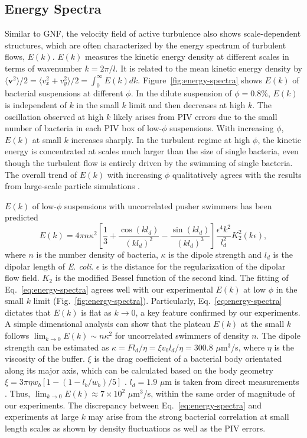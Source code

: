 \subsection{Energy Spectra}
Similar to GNF, the velocity field of active turbulence also shows scale-dependent structures, which are often characterized by the energy spectrum of turbulent flows, $E(k)$. $E(k)$ measures the kinetic energy density at different scales in terms of wavenumber $k = 2\pi/l$. It is related to the mean kinetic energy density by $\langle \bm{v}^2 \rangle/2 = \langle v_x^2 + v_y^2 \rangle/2 = \int_0^\infty E(k)dk$. Figure~\ref{fig:energy-spectra} shows $E(k)$ of bacterial suspensions at different $\phi$. In the dilute suspension of $\phi = 0.8 \%$, $E(k)$ is independent of $k$ in the small $k$ limit and then decreases at high $k$. The oscillation observed at high $k$ likely arises from PIV errors due to the small number of bacteria in each PIV box of low-$\phi$ suspensions. With increasing $\phi$, $E(k)$ at small $k$ increases sharply. In the turbulent regime at high $\phi$, the kinetic energy is concentrated at scales much larger than the size of single bacteria, even though the turbulent flow is entirely driven by the swimming of single bacteria. The overall trend of $E(k)$ with increasing $\phi$ qualitatively agrees with the results from large-scale particle simulations \cite{Saintillan2012,Bardfalvy2019}.

$E(k)$ of low-$\phi$ suspensions with uncorrelated pusher swimmers has been predicted \cite{Bardfalvy2019}
\begin{equation}
\label{eq:energy-spectra}
E(k) = 4\pi n \kappa^2 \left[ \frac{1}{3} + \frac{\cos(kl_d)}{(kl_d)^2} - \frac{\sin(kl_d)}{(kl_d)^3} \right] \frac{\epsilon^4k^2}{l_d^2} K_2^2(k\epsilon),
\end{equation}
where $n$ is the number density of bacteria, $\kappa$ is the dipole strength and $l_d$ is the dipolar length of \textit{E. coli}. $\epsilon$ is the distance for the regularization of the dipolar flow field. $K_2$ is the modified Bessel function of the second kind.
The fitting of Eq.~\ref{eq:energy-spectra} agrees well with our experimental $E(k)$ at low $\phi$ in the small $k$ limit (Fig.~\ref{fig:energy-spectra}). Particularly, Eq.~\ref{eq:energy-spectra} dictates that $E(k)$ is flat as $k \to 0$, a key feature confirmed by our experiments. A simple dimensional analysis can show that the plateau $E(k)$ at the small $k$ follows $\lim_{k \to 0}E(k) \sim n \kappa^2$ for uncorrelated swimmers of density $n$. The dipole strength can be estimated as $\kappa = Fl_d/\eta = \xi v_0 l_d/\eta = 300.8$ $\mu$m$^3$/s, where $\eta$ is the viscosity of the buffer. $\xi$ is the drag coefficient of a bacterial body orientated along its major axis, which can be calculated based on the body geometry $\xi = 3\pi\eta w_b \left[1-(1-l_b/w_b)/5\right]$ \cite{Magariyama2002}. $l_d = 1.9$ $\mu$m is taken from direct measurements \cite{Drescher2011}. Thus, $\lim_{k \to 0}E(k) \approx 7 \times 10^2$ $\mu$m$^3$/s, within the same order of magnitude of our experiments. The discrepancy between Eq.~\ref{eq:energy-spectra} and experiments at large $k$ may arise from the strong bacterial correlation at small length scales as shown by density fluctuations as well as the PIV errors.


